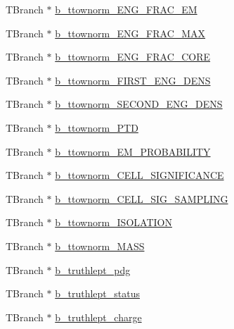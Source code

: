 \begin{DoxyCompactItemize}
\item 
T\+Branch $\ast$ \hyperlink{classJetAnalysisExample_ae7a12156a86e72db95d29eb77ea50576}{b\+\_\+ttownorm\+\_\+\+E\+N\+G\+\_\+\+F\+R\+A\+C\+\_\+\+EM}
\item 
T\+Branch $\ast$ \hyperlink{classJetAnalysisExample_a89579d893b32a215de27039cb5f692e2}{b\+\_\+ttownorm\+\_\+\+E\+N\+G\+\_\+\+F\+R\+A\+C\+\_\+\+M\+AX}
\item 
T\+Branch $\ast$ \hyperlink{classJetAnalysisExample_a3f5f7ee97f08e5277a2a4e65ea074cfd}{b\+\_\+ttownorm\+\_\+\+E\+N\+G\+\_\+\+F\+R\+A\+C\+\_\+\+C\+O\+RE}
\item 
T\+Branch $\ast$ \hyperlink{classJetAnalysisExample_a3716ce1835085fea921c7a34b0fad285}{b\+\_\+ttownorm\+\_\+\+F\+I\+R\+S\+T\+\_\+\+E\+N\+G\+\_\+\+D\+E\+NS}
\item 
T\+Branch $\ast$ \hyperlink{classJetAnalysisExample_ac666301017e27e9d2092662930de0f72}{b\+\_\+ttownorm\+\_\+\+S\+E\+C\+O\+N\+D\+\_\+\+E\+N\+G\+\_\+\+D\+E\+NS}
\item 
T\+Branch $\ast$ \hyperlink{classJetAnalysisExample_ad7686b3415ac866d2b5caa1907c00d23}{b\+\_\+ttownorm\+\_\+\+P\+TD}
\item 
T\+Branch $\ast$ \hyperlink{classJetAnalysisExample_a9831e051223e7c00b86286b48e0129d1}{b\+\_\+ttownorm\+\_\+\+E\+M\+\_\+\+P\+R\+O\+B\+A\+B\+I\+L\+I\+TY}
\item 
T\+Branch $\ast$ \hyperlink{classJetAnalysisExample_a9fbfdf18deb74753bbcce60dcc122f91}{b\+\_\+ttownorm\+\_\+\+C\+E\+L\+L\+\_\+\+S\+I\+G\+N\+I\+F\+I\+C\+A\+N\+CE}
\item 
T\+Branch $\ast$ \hyperlink{classJetAnalysisExample_aeef0d0b6d05f302dc1e52e73792388f6}{b\+\_\+ttownorm\+\_\+\+C\+E\+L\+L\+\_\+\+S\+I\+G\+\_\+\+S\+A\+M\+P\+L\+I\+NG}
\item 
T\+Branch $\ast$ \hyperlink{classJetAnalysisExample_aa424e9c4b3693d19103dfab028d733c1}{b\+\_\+ttownorm\+\_\+\+I\+S\+O\+L\+A\+T\+I\+ON}
\item 
T\+Branch $\ast$ \hyperlink{classJetAnalysisExample_a0266dccf11f765b27b41eccad924ab24}{b\+\_\+ttownorm\+\_\+\+M\+A\+SS}
\item 
T\+Branch $\ast$ \hyperlink{classJetAnalysisExample_ad6bc1edf6835006b66a3713db1d20595}{b\+\_\+truthlept\+\_\+pdg}
\item 
T\+Branch $\ast$ \hyperlink{classJetAnalysisExample_a75741db6d44e8164544d77ffd0d91e31}{b\+\_\+truthlept\+\_\+status}
\item 
T\+Branch $\ast$ \hyperlink{classJetAnalysisExample_ae9c70e032de285c7ff93f16d76278afa}{b\+\_\+truthlept\+\_\+charge}

\end{DoxyCompactItemize}

